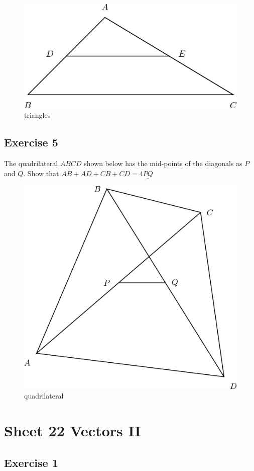\documentclass[
  11pt,
  oneside]{book}
\newcommand{\slide}{}
\theoremstyle{definition}
\theoremstyle{definition}
\theoremstyle{definition}
\theoremstyle{definition}
\theoremstyle{remark}
\begin{document}
\begin{figure}

{\centering \includegraphics[width=0.4\linewidth]{tikztopng-figure44} 

}

\caption{triangles}\label{fig:unnamed-chunk-98}
\end{figure}

\slide

\subsection*{Exercise 5}\label{exercise-5-6}

The quadrilateral \(ABCD\) shown below has the mid-points of the diagonals as \(P\) and \(Q\). Show that \(\underline{AB}+\underline{AD}+\underline{CB}+\underline{CD} = 4\underline{PQ}\)

\begin{figure}

{\centering \includegraphics[width=0.4\linewidth]{tikztopng-figure45} 

}

\caption{quadrilateral}\label{fig:unnamed-chunk-99}
\end{figure}

\slide

\section{Sheet 22 Vectors II}\label{sheet-22-vectors-ii}

\subsection*{Exercise 1}\label{exercise-1-13}
\end{document}
